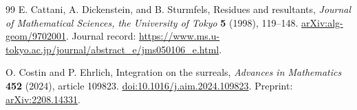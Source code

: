 \documentclass[11pt,letterpaper]{article}
\theoremstyle{definition}
\theoremstyle{remark}
\numberwithin{equation}{section}
\begin{document}
\begin{thebibliography}{99}
E. Cattani, A. Dickenstein, and B. Sturmfels,
Residues and resultants,
\emph{Journal of Mathematical Sciences, the University of Tokyo} \textbf{5} (1998), 119--148.
\href{https://arxiv.org/abs/alg-geom/9702001}{arXiv:alg-geom/9702001}.
Journal record: \url{https://www.ms.u-tokyo.ac.jp/journal/abstract_e/jms050106_e.html}.

O. Costin and P. Ehrlich,
Integration on the surreals,
\emph{Advances in Mathematics} \textbf{452} (2024), article 109823.
\href{https://doi.org/10.1016/j.aim.2024.109823}{doi:10.1016/j.aim.2024.109823}.
Preprint: \href{https://arxiv.org/abs/2208.14331}{arXiv:2208.14331}.

\end{thebibliography}
\end{document}
